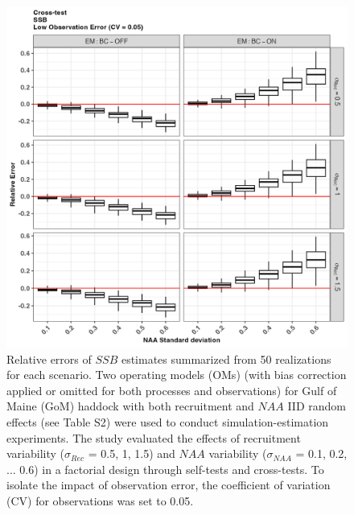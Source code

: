 \documentclass[
  12pt,
]{article}
\begin{document}
\begin{figure}[H]
\centering
\includegraphics[width=\textwidth]{Revised_Figures&Tables/SSB_low_cross_RE.PNG}
\caption{Relative errors of $SSB$ estimates summarized from 50 realizations for each scenario. Two operating models (OMs) (with bias correction applied or omitted for both processes and observations) for Gulf of Maine (GoM) haddock with both recruitment and $NAA$ IID random effects (see Table S2) were used to conduct simulation-estimation experiments. The study evaluated the effects of recruitment variability ($\sigma_{Rec}$ = 0.5, 1, 1.5) and $NAA$ variability ($\sigma_{NAA}$ = 0.1, 0.2, ... 0.6) in a factorial design through self-tests and cross-tests. To isolate the impact of observation error, the coefficient of variation (CV) for observations was set to 0.05.}
\label{fig:supp_SSB_low_cross_RE} 
\end{figure}
\end{document}

